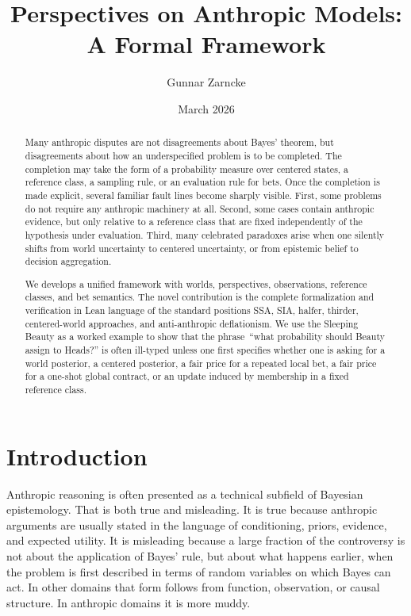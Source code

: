 \documentclass[11pt]{article}
\title{Perspectives on Anthropic Models: A Formal Framework}
\author{Gunnar Zarncke}
\date{March 2026}
\newcommand{\1}{\mathbf{1}}
\begin{document}
\maketitle

\begin{abstract}
Many anthropic disputes are not disagreements about Bayes' theorem, but disagreements about how an underspecified problem is to be completed. 
The completion may take the form of a probability measure over centered states, a reference class, a sampling rule, or an evaluation rule for bets. 
Once the completion is made explicit, several familiar fault lines become sharply visible. 
First, some problems do not require any anthropic machinery at all. 
Second, some cases contain anthropic evidence, but only relative to a reference class that are fixed independently of the hypothesis under evaluation. 
Third, many celebrated paradoxes arise when one silently shifts from world uncertainty to centered uncertainty, or from epistemic belief to decision aggregation.

We develops a unified framework with worlds, perspectives, observations, reference classes, and bet semantics. 
The novel contribution is the complete formalization and verification in Lean language of the standard positions 
SSA, SIA, halfer, thirder, centered-world approaches, and anti-anthropic deflationism.
We use the Sleeping Beauty as a worked example to show that the phrase \,``what probability should Beauty assign to Heads?'' is often ill-typed unless 
one first specifies whether one is asking for a world posterior, a centered posterior, a fair price for a repeated local bet, a fair price for a one-shot global contract, or 
an update induced by membership in a fixed reference class. 
\end{abstract}

\section{Introduction}

Anthropic reasoning is often presented as a technical subfield of Bayesian epistemology. That is both true and misleading. 
It is true because anthropic arguments are usually stated in the language of conditioning, priors, evidence, and expected utility. 
It is misleading because a large fraction of the controversy is not about the application of Bayes' rule, but about 
what happens earlier, when the problem is first described in terms of random variables on which Bayes can act.
In other domains that form follows from function, observation, or causal structure. In anthropic domains it is more muddy.
\end{document}
